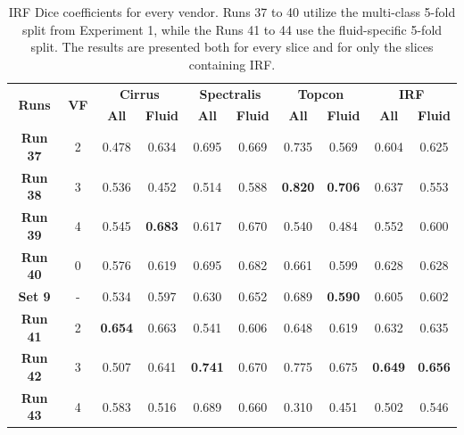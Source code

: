 \begin{table}[!ht]
	\caption{IRF Dice coefficients for every vendor. Runs 37 to 40 utilize the multi-class 5-fold split from Experiment 1, while the Runs 41 to 44 use the fluid-specific 5-fold split. The results are presented both for every slice and for only the slices containing IRF.}
	\centering
	\begin{tabular}{|c|c|cc|cc|cc|cc|}
			\hline
			\multirow{2}{*}{\textbf{Runs}} &
			\multirow{2}{*}{\textbf{VF}} & 
			\multicolumn{2}{c|}{\textbf{Cirrus}} & 
			\multicolumn{2}{c|}{\textbf{Spectralis}} & 
			\multicolumn{2}{c|}{\textbf{Topcon}} & 
			\multicolumn{2}{c|}{\textbf{IRF}} \\ 
			\cline{3-10} & &
			\multicolumn{1}{c}{\textbf{All}} &  
			\textbf{\textbf{Fluid}} & 
			\multicolumn{1}{c}{\textbf{All}} &  
			\textbf{\textbf{Fluid}} & 
			\multicolumn{1}{c}{\textbf{All}} & 
			\textbf{\textbf{Fluid}} & 
			\multicolumn{1}{c}{\textbf{All}} & 
			\textbf{\textbf{Fluid}}\\ 
			
			\hline
			
			\textbf{Run 37} & 2 & 0.478 & 0.634 & 0.695 & 0.669 & 0.735 & 0.569 & 0.604 & 0.625 \\
			
			\textbf{Run 38} & 3 & 0.536 & 0.452 & 0.514 & 0.588 & \textbf{0.820} & \textbf{0.706} & 0.637 & 0.553 \\
			
			\textbf{Run 39} & 4 & 0.545 & \textbf{0.683} & 0.617 & 0.670 & 0.540 & 0.484 & 0.552 & 0.600 \\
			
			\textbf{Run 40} & 0 & 0.576 & 0.619 & 0.695 & 0.682 & 0.661 & 0.599 & 0.628 & 0.628 \\
			
			\hline
			
			\textbf{Set 9} & - & 0.534 & 0.597 & 0.630 & 0.652 & 0.689 & \textbf{0.590} & 0.605 & 0.602 \\
			
			\hline
			\hline
			
			\textbf{Run 41} & 2 & \textbf{0.654} & 0.663 & 0.541 & 0.606 & 0.648 & 0.619 & 0.632 & 0.635 \\
			
			\textbf{Run 42} & 3 & 0.507 & 0.641 & \textbf{0.741} & 0.670 & 0.775 & 0.675 & \textbf{0.649} & \textbf{0.656} \\
			
			\textbf{Run 43} & 4 & 0.583 & 0.516 & 0.689 & 0.660 & 0.310 & 0.451 & 0.502 & 0.546 \\
			

\end{tabular}
\end{table}
